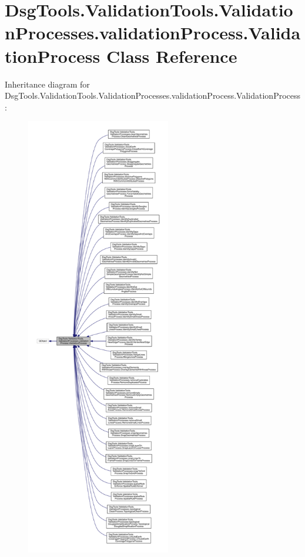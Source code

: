 \hypertarget{class_dsg_tools_1_1_validation_tools_1_1_validation_processes_1_1validation_process_1_1_validation_process}{}\section{Dsg\+Tools.\+Validation\+Tools.\+Validation\+Processes.\+validation\+Process.\+Validation\+Process Class Reference}
\label{class_dsg_tools_1_1_validation_tools_1_1_validation_processes_1_1validation_process_1_1_validation_process}


Inheritance diagram for Dsg\+Tools.\+Validation\+Tools.\+Validation\+Processes.\+validation\+Process.\+Validation\+Process\+:
\nopagebreak
\begin{figure}[H]
\begin{center}
\leavevmode
\includegraphics[height=550pt]{class_dsg_tools_1_1_validation_tools_1_1_validation_processes_1_1validation_process_1_1_validation_process__inherit__graph}
\end{center}
\end{figure}


